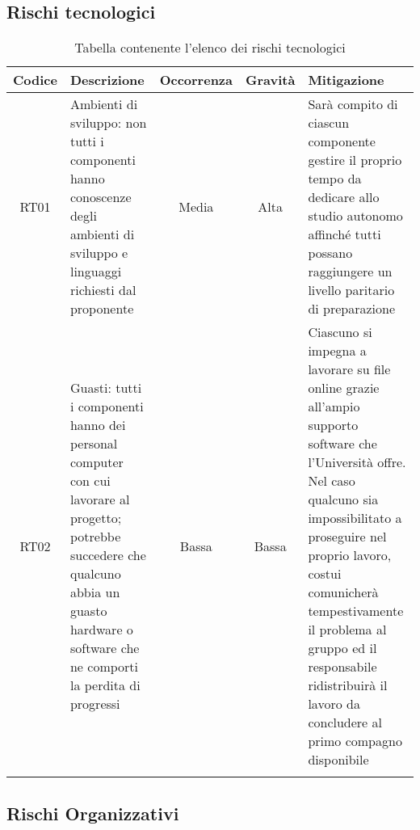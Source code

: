 \documentclass[../piano_di_progetto.tex]{subfiles}
\begin{document}
\newpage

\subsection{Rischi tecnologici}%
\label{sub:rischi_tec}

\begin{center}
	\begin{longtable}{|c|p{4.5cm}|c|c|p{4.5cm}|}
		\hline
		\rowcolor{lightgray}
		{\textbf{Codice}} & {\textbf{Descrizione}} & {\textbf{Occorrenza}} & {\textbf{Gravità}} & {\textbf{Mitigazione}}                                                                                                                                                                                                                \\

		\hline
		RT01              &
		Ambienti di sviluppo: non tutti i componenti hanno conoscenze degli ambienti di sviluppo e linguaggi richiesti dal proponente
		                  &
		Media
		                  &
		Alta
		                  &
		Sarà compito di ciascun componente gestire il proprio tempo da dedicare allo studio autonomo affinché tutti possano raggiungere un livello paritario di preparazione                                                                                                                                                            \\
		
		RT02              &
		Guasti: tutti i componenti hanno dei personal computer con cui lavorare al progetto; potrebbe succedere che qualcuno abbia un guasto hardware o software che ne comporti la perdita di progressi
		                  &
		Bassa
		                  &
		Bassa
		                  &
		Ciascuno si impegna a lavorare su file online grazie all’ampio supporto software che l’Università offre. Nel caso qualcuno sia impossibilitato a proseguire nel proprio lavoro, costui comunicherà tempestivamente il problema al gruppo ed il responsabile ridistribuirà il lavoro da concludere al primo compagno disponibile \\
		\hline
		\rowcolor{white}
		\caption{Tabella contenente l'elenco dei rischi tecnologici}
	\end{longtable}
\end{center}

\subsection{Rischi Organizzativi}%
\label{sub:rischi_org}
\end{document}
